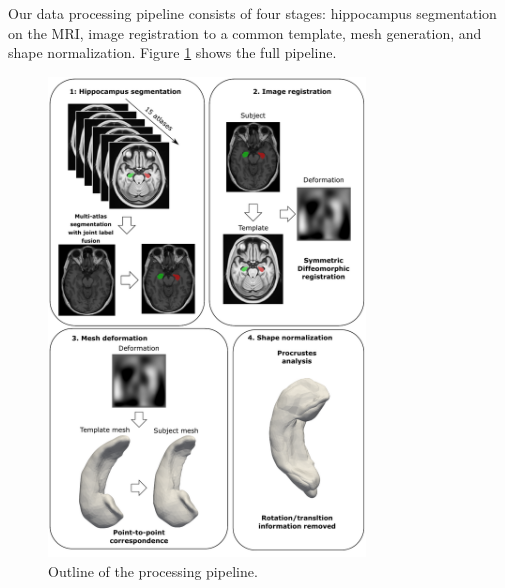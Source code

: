 Our data processing pipeline consists of four stages: hippocampus segmentation on the MRI, image registration to a common template, mesh generation, and shape normalization. Figure \ref{fig:pipeline} shows the full pipeline.

\begin{figure}[htbp]
  \centering
  \includegraphics[width=0.75\textwidth]{figures/hippocampus/figure_pipeline.pdf}
  \caption{Outline of the processing pipeline.}\label{fig:pipeline}
\end{figure}

